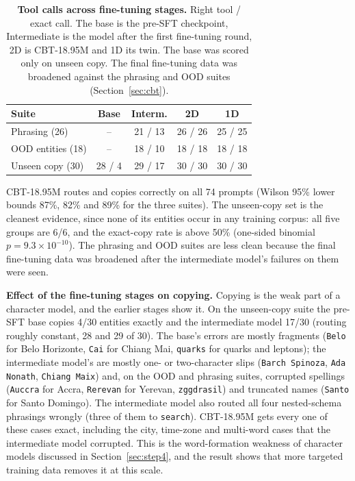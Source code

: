\documentclass[10pt,twocolumn]{article}
\begin{document}
\begin{table}[!t]
\centering
\footnotesize
\setlength{\tabcolsep}{3pt}
\caption{\textbf{Tool calls across fine-tuning stages.} Right tool / exact call. The base is the pre-SFT checkpoint, Intermediate is the model after the first fine-tuning round, 2D is CBT-18.95M and 1D its twin. The base was scored only on unseen copy. The final fine-tuning data was broadened against the phrasing and OOD suites (Section~\ref{sec:cbt}).}\label{tab:cbttools}
\begin{tabular}{@{}lcccc@{}}
\toprule
Suite & Base & Interm. & 2D & 1D \\
\midrule
Phrasing (26) & -- & 21 / 13 & 26 / 26 & 25 / 25 \\
OOD entities (18) & -- & 18 / 10 & 18 / 18 & 18 / 18 \\
Unseen copy (30) & 28 / 4 & 29 / 17 & 30 / 30 & 30 / 30 \\
\bottomrule
\end{tabular}
\end{table}

CBT-18.95M routes and copies correctly on all 74 prompts (Wilson 95\% lower bounds 87\%, 82\% and 89\% for the three suites). The unseen-copy set is the cleanest evidence, since none of its entities occur in any training corpus: all five groups are 6/6, and the exact-copy rate is above 50\% (one-sided binomial $p=9.3\times10^{-10}$). The phrasing and OOD suites are less clean because the final fine-tuning data was broadened after the intermediate model's failures on them were seen.

\textbf{Effect of the fine-tuning stages on copying.} Copying is the weak part of a character model, and the earlier stages show it. On the unseen-copy suite the pre-SFT base copies 4/30 entities exactly and the intermediate model 17/30 (routing roughly constant, 28 and 29 of 30). The base's errors are mostly fragments (\texttt{Belo} for Belo Horizonte, \texttt{Cai} for Chiang Mai, \texttt{quarks} for quarks and leptons); the intermediate model's are mostly one- or two-character slips (\texttt{Barch Spinoza}, \texttt{Ada Nonath}, \texttt{Chiang Maix}) and, on the OOD and phrasing suites, corrupted spellings (\texttt{Auccra} for Accra, \texttt{Rerevan} for Yerevan, \texttt{zggdrasil}) and truncated names (\texttt{Santo} for Santo Domingo). The intermediate model also routed all four nested-schema phrasings wrongly (three of them to \texttt{search}). CBT-18.95M gets every one of these cases exact, including the city, time-zone and multi-word cases that the intermediate model corrupted. This is the word-formation weakness of character models discussed in Section~\ref{sec:step4}, and the result shows that more targeted training data removes it at this scale.
\end{document}
